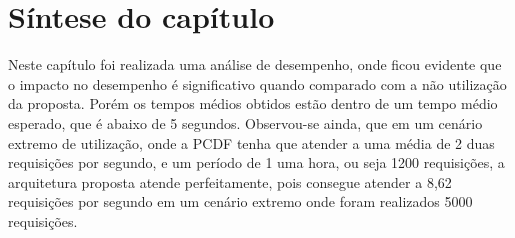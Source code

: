 

\section{Síntese do capítulo}

Neste cap\'{i}tulo foi realizada uma análise de desempenho, onde ficou evidente que o impacto no desempenho é significativo quando comparado com a não utilização da proposta. Porém os tempos médios obtidos estão dentro de um tempo médio esperado, que é abaixo de 5 segundos. Observou-se ainda, que em um cenário extremo de utilização, onde a PCDF tenha que atender a uma média de 2 duas requisições por segundo, e um período de 1 uma hora, ou seja 1200 requisições, a arquitetura proposta atende perfeitamente, pois consegue atender a 8,62 requisições por segundo em um cenário extremo onde foram realizados 5000 requisições.
